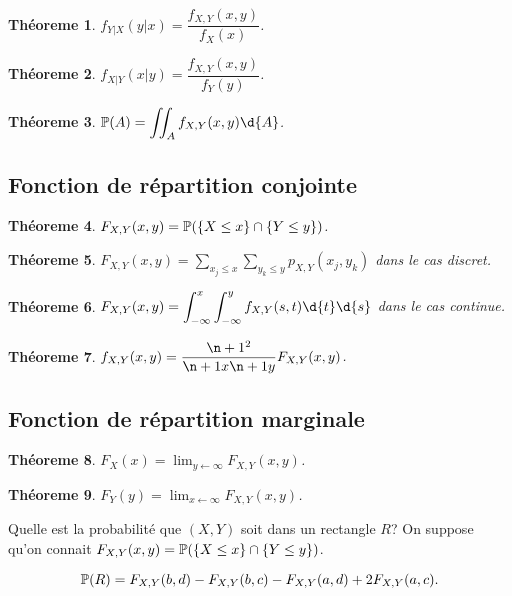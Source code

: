 \documentclass[11pt]{article}
\renewcommand\P{%
	\ensuremath{%
		\mathbb{P}%
	}%
}%
\newtheorem{theoreme}{Théoreme}[section]
\begin{document}
\begin{theoreme}
	$f_{Y|X}(y|x)=\dfrac{f_{X,Y}(x,y)}{f_X(x)}$.
\end{theoreme}

\begin{theoreme}
	$f_{X|Y}(x|y)=\dfrac{f_{X,Y}(x,y)}{f_Y(y)}$.
\end{theoreme}

\begin{theoreme}
	$\P(A)=\displaystyle\iint_Af_{X,Y}(x,y)\d{A}$.
\end{theoreme}

\subsection{Fonction de répartition conjointe}
\begin{theoreme}
	$F_{X,Y}(x,y)=\P(\left\{X\leq x\right\}\cap\left\{Y\leq y\right\})$.
\end{theoreme}

\begin{theoreme}
	$F_{X,Y}(x,y)=\displaystyle\sum_{x_j\leq x}
	\displaystyle\sum_{y_k\leq y}p_{X,Y}(x_j,y_k)$ dans le cas discret.
\end{theoreme}

\begin{theoreme}
	$F_{X,Y}(x,y)=\displaystyle\int_{-\infty}^x
	\displaystyle\int_{-\infty}^yf_{X,Y}(s,t)\d{t}\d{s}$ dans le cas continue.
\end{theoreme}

\begin{theoreme}
	$f_{X,Y}(x,y)=\dfrac{\p{}^2}{\p{x}\p{y}}F_{X,Y}(x,y)$.
\end{theoreme}

\subsection{Fonction de répartition marginale}
\begin{theoreme}
	$F_X(x)=\displaystyle\lim_{y\leftarrow\infty}F_{X,Y}(x,y)$.
\end{theoreme}

\begin{theoreme}
	$F_Y(y)=\displaystyle\lim_{x\leftarrow\infty}F_{X,Y}(x,y)$.
\end{theoreme}

\begin{exemple}
	Quelle est la probabilité que $(X,Y)$ soit dans un rectangle $R$? On
	suppose qu'on connait $F_{X,Y}(x,y)=\P(\left\{X\leq x\right\}\cap
	\left\{Y\leq y\right\})$.

	\begin{equation*}
		\P(R)
		=F_{X,Y}(b,d)-F_{X,Y}(b,c)-F_{X,Y}(a,d)+2F_{X,Y}(a,c).
	\end{equation*}
\end{exemple}
\end{document}
